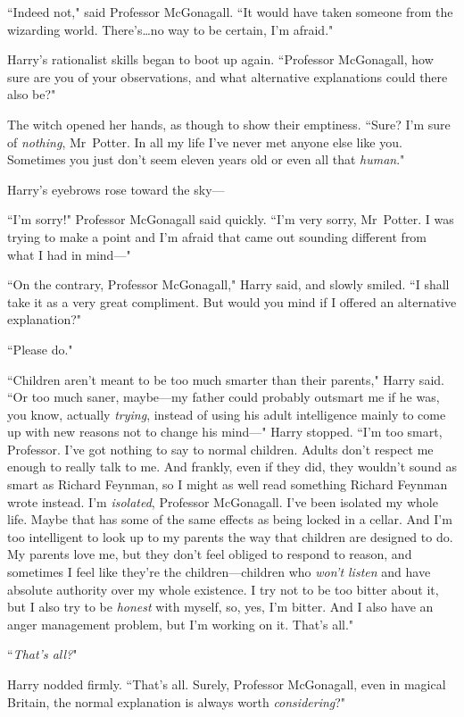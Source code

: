 ``Indeed not," said Professor McGonagall. ``It would have taken someone from the wizarding world. There's…no way to be certain, I'm afraid."

Harry's rationalist skills began to boot up again. ``Professor McGonagall, how sure are you of your observations, and what alternative explanations could there also be?"

The witch opened her hands, as though to show their emptiness. ``Sure? I'm sure of \emph{nothing}, Mr~Potter. In all my life I've never met anyone else like you. Sometimes you just don't seem eleven years old or even all that \emph{human}."

Harry's eyebrows rose toward the sky—

``I'm sorry!" Professor McGonagall said quickly. ``I'm very sorry, Mr~Potter. I was trying to make a point and I'm afraid that came out sounding different from what I had in mind—"

``On the contrary, Professor McGonagall," Harry said, and slowly smiled. ``I shall take it as a very great compliment. But would you mind if I offered an alternative explanation?"

``Please do."

``Children aren't meant to be too much smarter than their parents," Harry said. ``Or too much saner, maybe—my father could probably outsmart me if he was, you know, actually \emph{trying}, instead of using his adult intelligence mainly to come up with new reasons not to change his mind—" Harry stopped. ``I'm too smart, Professor. I've got nothing to say to normal children. Adults don't respect me enough to really talk to me. And frankly, even if they did, they wouldn't sound as smart as Richard Feynman, so I might as well read something Richard Feynman wrote instead. I'm \emph{isolated}, Professor McGonagall. I've been isolated my whole life. Maybe that has some of the same effects as being locked in a cellar. And I'm too intelligent to look up to my parents the way that children are designed to do. My parents love me, but they don't feel obliged to respond to reason, and sometimes I feel like they're the children—children who \emph{won't listen} and have absolute authority over my whole existence. I try not to be too bitter about it, but I also try to be \emph{honest} with myself, so, yes, I'm bitter. And I also have an anger management problem, but I'm working on it. That's all."

``\emph{That's all?}"

Harry nodded firmly. ``That's all. Surely, Professor McGonagall, even in magical Britain, the normal explanation is always worth \emph{considering}?"


